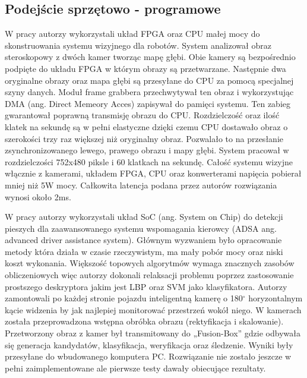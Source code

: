 \subsection{Podejście sprzętowo - programowe}

W pracy \cite{honegger2014real} autorzy wykorzystali układ FPGA oraz CPU małej mocy do skonstruowania systemu wizyjnego dla robotów. System analizował obraz steroskopowy z dwóch kamer tworząc mapę głębi. Obie kamery są bezpośrednio podpięte do układu FPGA w którym obrazy są przetwarzane. Następnie dwa oryginalne obrazy oraz mapa głębi są przesyłane do CPU za pomocą specjalnej szyny danych. Moduł frame grabbera przechwytywał ten obraz i wykorzystując DMA (ang. Direct Memeory Acces) zapisywał do pamięci systemu. Ten zabieg gwarantował poprawną transmisję obrazu do CPU. Rozdzielczość oraz ilość klatek na sekundę są w pełni elastyczne dzięki czemu CPU dostawało obraz o szerokości trzy raz większej niż oryginalny obraz. Pozwalało to na przesłanie zsynchronizowanego lewego, prawego obrazu i mapy głębi. System pracował w rozdzielczości 752x480 piksle i 60 klatkach na sekundę. Całość systemu wizyjne włącznie z kamerami, układem FPGA, CPU oraz konwerterami napięcia pobierał mniej niż 5W mocy. Całkowita latencja podana przez autorów rozwiązania wynosi około 2ms.

W pracy \cite{piao2016real} autorzy wykorzystali układ SoC (ang. System on Chip) do detekcji pieszych dla zaawansowanego systemu wspomagania kierowcy (ADSA ang. advanced driver assistance system). Głównym wyzwaniem było opracowanie metody która działa w czasie rzeczywistym, ma mały pobór mocy oraz niski koszt wykonania. Większość topowych algorytmów  wymaga znacznych zasobów obliczeniowych więc autorzy dokonali relaksacji problemu poprzez zastosowanie prostszego deskryptora jakim jest LBP oraz SVM jako klasyfikatora. Autorzy zamontowali po każdej stronie pojazdu inteligentną kamerę o 180$^\circ$ horyzontalnym kącie widzenia by jak najlepiej monitorować przestrzeń wokół niego. W kamerach została przeprowadzona wstępna obróbka obrazu (rektyfikacja i skalowanie). Przetworzony obraz z kamer był transmitowany do „Fusion-Box” gdzie odbywała się generacja kandydatów, klasyfikacja, weryfikacja oraz śledzenie. Wyniki były przesyłane do wbudowanego komputera PC. Rozwiązanie nie zostało jeszcze w pełni zaimplementowane ale pierwsze testy dawały obiecujące rezultaty.

